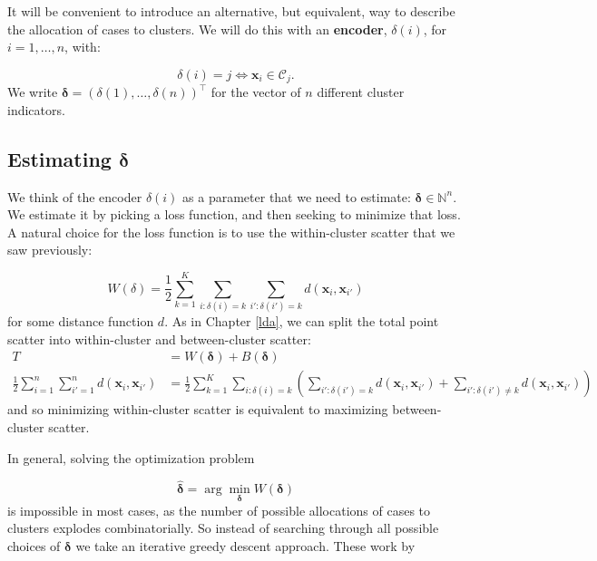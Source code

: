 \documentclass[
]{book}
\theoremstyle{definition}
\theoremstyle{definition}
\theoremstyle{definition}
\theoremstyle{definition}
\theoremstyle{remark}
\begin{document}
It will be convenient to introduce an alternative, but equivalent, way to describe the allocation of cases to clusters. We will do this with an \textbf{encoder}, \(\delta(i)\), for \(i=1, \ldots,n\), with:

\begin{equation}
\delta(i) = j \iff \mathbf x_i \in \mathcal{C}_j. 
\label{eq:two-way}
\end{equation}
We write \(\boldsymbol \delta=(\delta(1),\ldots , \delta(n))^\top\) for the vector of \(n\) different cluster indicators.

\hypertarget{estimating-boldsymbol-delta}{%
\subsection{\texorpdfstring{Estimating \(\boldsymbol \delta\)}{Estimating \textbackslash boldsymbol \textbackslash delta}}\label{estimating-boldsymbol-delta}}

We think of the encoder \(\delta(i)\) as a parameter that we need to estimate: \(\boldsymbol \delta\in \mathbb{N}^{n}\). We estimate it by picking a loss function, and then seeking to minimize that loss. A natural choice for the loss function is to use the within-cluster scatter that we saw previously:

\[W(\delta) = \frac{1}{2}\sum_{k=1}^K \sum_{i: \delta(i)=k} \sum_{i': \delta(i')=k} d(\mathbf x_i, \mathbf x_{i'})\]
for some distance function \(d\). As in Chapter \ref{lda}, we can split the total point scatter into within-cluster and between-cluster scatter:
\begin{align}
T&= W(\boldsymbol \delta)+B(\boldsymbol \delta)\\
\frac{1}{2}\sum_{i=1}^n \sum_{i'=1}^n d(\mathbf x_i, \mathbf x_{i'})&= \frac{1}{2}\sum_{k=1}^K \sum_{i: \delta(i)=k} \left(\sum_{i': \delta(i')=k} d(\mathbf x_i, \mathbf x_{i'})+\sum_{i': \delta(i')\not=k} d(\mathbf x_i, \mathbf x_{i'})\right)
\end{align}
and so minimizing within-cluster scatter is equivalent to maximizing between-cluster scatter.

In general, solving the optimization problem

\[\hat{\boldsymbol \delta} = \arg \min_{\boldsymbol \delta} W(\boldsymbol \delta)\]
is impossible in most cases, as the number of possible allocations of cases to clusters explodes combinatorially. So instead of searching through all possible choices of \(\boldsymbol \delta\) we take an iterative greedy descent approach. These work by
\end{document}
